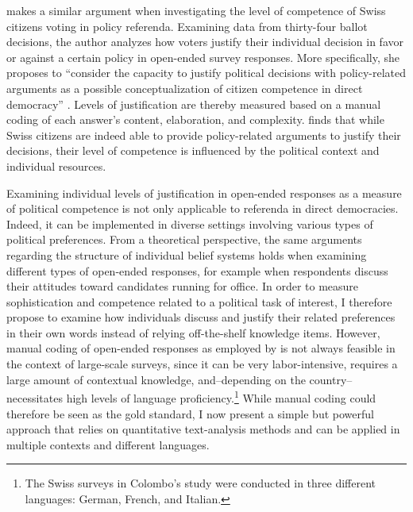 \documentclass[12pt]{article}
\begin{document}
\citet{colombo2016justifications} makes a similar argument when investigating the level of competence of Swiss citizens voting in policy referenda. Examining data from thirty-four ballot decisions, the author analyzes how voters justify their individual decision in favor or against a certain policy in open-ended survey responses. More specifically, she proposes to ``consider the capacity to justify political decisions with policy-related arguments as a possible conceptualization of citizen competence in direct democracy'' \citep[3]{colombo2016justifications}. Levels of justification are thereby measured based on a manual coding of each answer's content, elaboration, and complexity. \citet{colombo2016justifications} finds that while Swiss citizens are indeed able to provide policy-related arguments to justify their decisions, their level of competence is influenced by the political context and individual resources.

Examining individual levels of justification in open-ended responses as a measure of political competence is not only applicable to referenda in direct democracies. Indeed, it can be implemented in diverse settings involving various types of political preferences. From a theoretical perspective, the same arguments regarding the structure of individual belief systems holds when examining different types of open-ended responses, for example when respondents discuss their attitudes toward candidates running for office. In order to measure sophistication and competence related to a political task of interest, I therefore propose to examine how individuals discuss and justify their related preferences in their own words instead of relying off-the-shelf knowledge items. However, manual coding of open-ended responses as employed by \citet{colombo2016justifications} is not always feasible in the context of large-scale surveys, since it can be very labor-intensive, requires a large amount of contextual knowledge, and--depending on the country--necessitates high levels of language proficiency.\footnote{The Swiss surveys in Colombo's \citeyearpar{colombo2016justifications} study were conducted in three different languages: German, French, and Italian.} While manual coding could therefore be seen as the gold standard, I now present a simple but powerful approach that relies on quantitative text-analysis methods and can be applied in multiple contexts and different languages.


\end{document}
